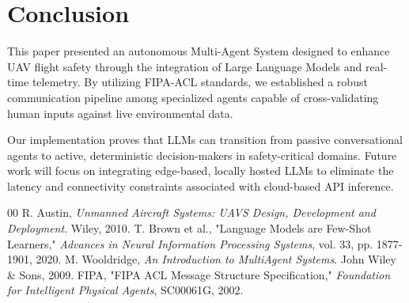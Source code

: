 \documentclass[conference]{IEEEtran}
\begin{document}
\section{Conclusion}

This paper presented an autonomous Multi-Agent System designed to enhance UAV flight safety through the integration of Large Language Models and real-time telemetry. By utilizing FIPA-ACL standards, we established a robust communication pipeline among specialized agents capable of cross-validating human inputs against live environmental data. 

Our implementation proves that LLMs can transition from passive conversational agents to active, deterministic decision-makers in safety-critical domains. Future work will focus on integrating edge-based, locally hosted LLMs to eliminate the latency and connectivity constraints associated with cloud-based API inference.

\begin{thebibliography}{00}
 R. Austin, \textit{Unmanned Aircraft Systems: UAVS Design, Development and Deployment}. Wiley, 2010.
 T. Brown et al., "Language Models are Few-Shot Learners," \textit{Advances in Neural Information Processing Systems}, vol. 33, pp. 1877-1901, 2020.
 M. Wooldridge, \textit{An Introduction to MultiAgent Systems}. John Wiley \& Sons, 2009.
 FIPA, "FIPA ACL Message Structure Specification," \textit{Foundation for Intelligent Physical Agents}, SC00061G, 2002.
\end{thebibliography}
\end{document}
